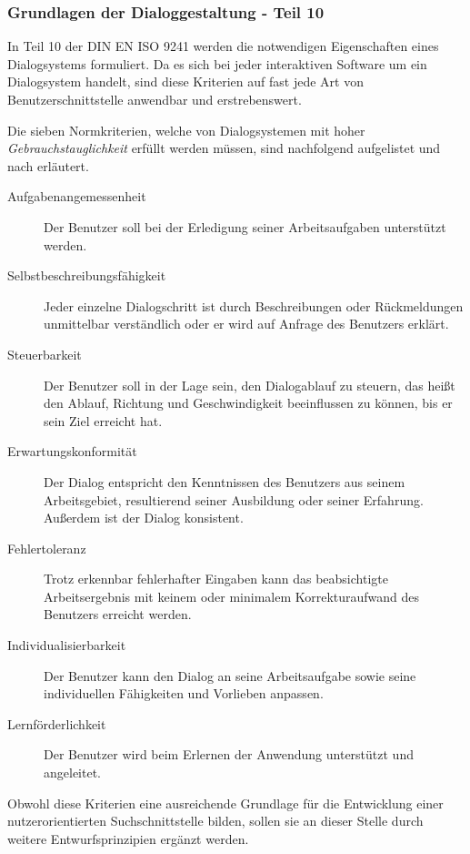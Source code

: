 \subsubsection{Grundlagen der Dialoggestaltung - Teil 10}\label{sec:DIN9241-10}

In Teil 10 der DIN EN ISO 9241 werden die notwendigen Eigenschaften eines Dialogsystems formuliert. Da es sich bei jeder interaktiven Software um ein Dialogsystem handelt, sind diese Kriterien auf fast jede Art von Benutzerschnittstelle anwendbar und erstrebenswert.

Die sieben Normkriterien, welche von Dialogsystemen mit hoher \emph{Gebrauchstauglichkeit} erfüllt werden müssen, sind nachfolgend aufgelistet und nach \citet[][]{dahm06} erläutert.

\begin{description}
	\item[Aufgabenangemessenheit]{Der Benutzer soll bei der Erledigung seiner Arbeitsaufgaben unterstützt werden.}
	\item[Selbstbeschreibungsfähigkeit]{Jeder einzelne Dialogschritt ist durch Beschreibungen oder Rückmeldungen unmittelbar verständlich oder er wird auf Anfrage des Benutzers erklärt.}
	\item[Steuerbarkeit]{Der Benutzer soll in der Lage sein, den Dialogablauf zu steuern, das heißt den Ablauf, Richtung und Geschwindigkeit beeinflussen zu können, bis er sein Ziel erreicht hat.}
	\item[Erwartungskonformität]{Der Dialog entspricht den Kenntnissen des Benutzers aus seinem Arbeitsgebiet, resultierend seiner Ausbildung oder seiner Erfahrung. Außerdem ist der Dialog konsistent.}
	\item[Fehlertoleranz]{Trotz erkennbar fehlerhafter Eingaben kann das beabsichtigte Arbeitsergebnis mit keinem oder minimalem Korrekturaufwand des Benutzers erreicht werden.}
	\item[Individualisierbarkeit]{Der Benutzer kann den Dialog an seine Arbeitsaufgabe sowie seine individuellen Fähigkeiten und Vorlieben anpassen.}
	\item[Lernförderlichkeit]{Der Benutzer wird beim Erlernen der Anwendung unterstützt und angeleitet.}
\end{description}

Obwohl diese Kriterien eine ausreichende Grundlage für die Entwicklung einer nutzerorientierten Suchschnittstelle bilden, sollen sie an dieser Stelle durch weitere Entwurfsprinzipien ergänzt werden.

